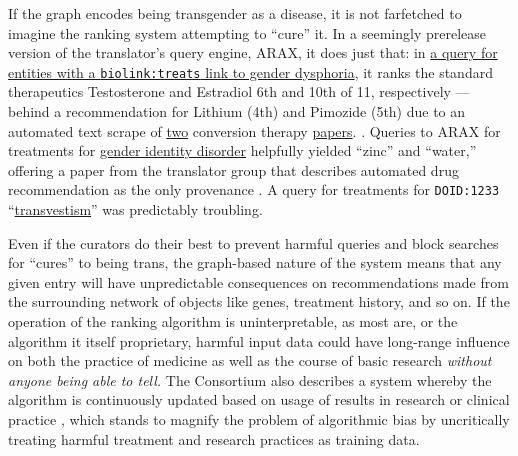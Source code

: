 If the graph encodes being transgender as a disease, it is not
farfetched to imagine the ranking system attempting to ``cure'' it. In a
seemingly prerelease version of the translator's query engine, ARAX, it
does just that: in
\href{https://arax.rtx.ai/?r=e891e6e6-44fd-4684-9d36-f94e3e81b554}{a
query for entities with a \texttt{biolink:treats} link to gender
dysphoria}, it
ranks the standard therapeutics \citep{deutschOverviewFeminizingHormone2016, deutschOverviewMasculinizingHormone2016}  Testosterone and Estradiol
6th and 10th of 11, respectively --- behind a recommendation for Lithium
(4th) and Pimozide (5th) due to an automated text scrape of
\href{https://pubmed.ncbi.nlm.nih.gov/2114800/}{two} conversion therapy
\href{https://pubmed.ncbi.nlm.nih.gov/8839957/}{papers}. . Queries to ARAX for
treatments for \href{https://arax.ncats.io/?r=52703}{gender identity
disorder} helpfully yielded ``zinc'' and ``water,'' offering a paper
from the translator group that describes automated drug recommendation
as the only provenance \citep{womackLeveragingDistributedBiomedical2019} . A query for treatments
for \texttt{DOID:1233}
``\href{https://arax.rtx.ai/?r=81249a42-b300-4dcf-94c9-7a9fe2f78237}{transvestism}''
was predictably troubling.

Even if the curators do their best to prevent harmful queries and block
searches for ``cures'' to being trans, the graph-based nature of the
system means that any given entry will have unpredictable consequences
on recommendations made from the surrounding network of objects like
genes, treatment history, and so on. If the operation of the ranking
algorithm is uninterpretable, as most are, or the algorithm it itself
proprietary, harmful input data could have long-range influence on both
the practice of medicine as well as the course of basic research
\emph{without anyone being able to tell.} The Consortium also describes
a system whereby the algorithm is continuously updated based on usage of
results in research or clinical practice \citep{consortiumUniversalBiomedicalData2019} , which stands to magnify the
problem of algorithmic bias by uncritically treating harmful treatment
and research practices as training data.

